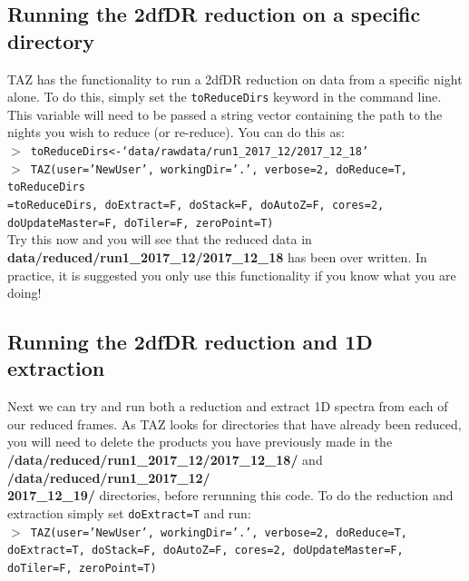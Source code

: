 \documentclass[12pt]{article}
\begin{document}
\subsection{Running the 2dfDR reduction on a specific directory}

TAZ has the functionality to run a 2dfDR reduction on data from a specific night alone. To do this, simply set the \texttt{toReduceDirs} keyword in the command line. This variable will need to be passed a string vector containing the path to the nights you wish to reduce (or re-reduce). You can do this as: \\


\hspace{10mm} \texttt{$>$ toReduceDirs<-`data/rawdata/run1\_2017\_12/2017\_12\_18'}\\

\hspace{10mm} \texttt{$>$ TAZ(user='NewUser', workingDir='.', verbose=2, doReduce=T, toReduceDirs \\ =toReduceDirs, doExtract=F, doStack=F, doAutoZ=F, cores=2, doUpdateMaster=F, doTiler=F, zeroPoint=T)}\\

Try this now and you will see that the reduced data in \textbf{data/reduced/run1\_2017\_12/2017\_12\_18} has been over written. In practice, it is suggested you only use this functionality if you know what you are doing!
 

\subsection{Running the 2dfDR reduction and 1D extraction}

Next we can try and run both a reduction and extract 1D spectra from each of our reduced frames. As TAZ looks for directories that have already been reduced, you will need to delete the products you have previously made in the \textbf{/data/reduced/run1\_2017\_12/2017\_12\_18/} and \textbf{/data/reduced/run1\_2017\_12/ \\ 2017\_12\_19/} directories, before rerunning this code. To do the reduction and extraction simply set \texttt{doExtract=T} and run:\\

\hspace{10mm} \texttt{$>$ TAZ(user='NewUser', workingDir='.', verbose=2, doReduce=T, doExtract=T, doStack=F, doAutoZ=F, cores=2, doUpdateMaster=F, doTiler=F, zeroPoint=T)}\\
\end{document}
